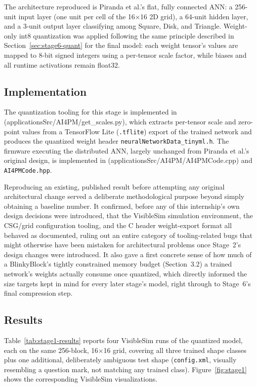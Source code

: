 \documentclass[12pt,a4paper]{report}
\begin{document}
The architecture reproduced is Piranda et al.'s flat, fully connected ANN: a 256-unit input layer (one unit per cell of the 16$\times$16 2D grid), a 64-unit hidden layer, and a 3-unit output layer classifying among Square, Disk, and Triangle. Weight-only int8 quantization was applied following the same principle described in Section~\ref{sec:stage6-quant} for the final model: each weight tensor's values are mapped to 8-bit signed integers using a per-tensor scale factor, while biases and all runtime activations remain float32.

\subsection*{Implementation}

The quantization tooling for this stage is implemented in (applicationsSrc/AI4PM/get\_scales.py), which extracts per-tensor scale and zero-point values from a TensorFlow Lite (\texttt{.tflite}) export of the trained network and produces the quantized weight header \texttt{neuralNetworkData\_tinyml.h}. The firmware executing the distributed ANN, largely unchanged from Piranda et al.'s original design, is implemented in (applicationsSrc/AI4PM/AI4PMCode.cpp) and \texttt{AI4PMCode.hpp}.

Reproducing an existing, published result before attempting any original architectural change served a deliberate methodological purpose beyond simply obtaining a baseline number. It confirmed, before any of this internship's own design decisions were introduced, that the VisibleSim simulation environment, the CSG/grid configuration tooling, and the C header weight-export format all behaved as documented, ruling out an entire category of tooling-related bugs that might otherwise have been mistaken for architectural problems once Stage~2's design changes were introduced. It also gave a first concrete sense of how much of a BlinkyBlock's tightly constrained memory budget (Section~3.2) a trained network's weights actually consume once quantized, which directly informed the size targets kept in mind for every later stage's model, right through to Stage~6's final compression step.

\subsection*{Results}

Table~\ref{tab:stage1-results} reports four VisibleSim runs of the quantized model, each on the same 256-block, 16$\times$16 grid, covering all three trained shape classes plus one additional, deliberately ambiguous test shape (\texttt{config.xml}, visually resembling a question mark, not matching any trained class). Figure~\ref{fig:stage1} shows the corresponding VisibleSim visualizations.
\end{document}
